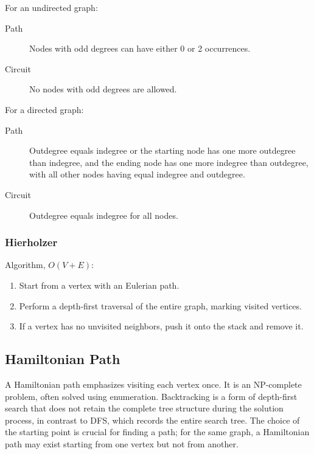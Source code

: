 \documentclass[11pt,journal,compsoc]{IEEEtran}
\begin{document}
For an undirected graph:

\begin{description}
    \item[Path] Nodes with odd degrees can have either 0 or 2 occurrences.
    
    \item[Circuit] No nodes with odd degrees are allowed.
\end{description}

For a directed graph:

\begin{description}
    \item[Path] Outdegree equals indegree or the starting node has one more outdegree than indegree, and the ending node has one more indegree than outdegree, with all other nodes having equal indegree and outdegree.
    
    \item[Circuit] Outdegree equals indegree for all nodes.
\end{description}

\subsubsection{Hierholzer}

Algorithm, $O(V + E)$:

\begin{enumerate}
    \item Start from a vertex with an Eulerian path.
    
    \item Perform a depth-first traversal of the entire graph, marking visited vertices.
    
    \item If a vertex has no unvisited neighbors, push it onto the stack and remove it.
\end{enumerate}

\subsection{Hamiltonian Path}

A Hamiltonian path emphasizes visiting each vertex once. It is an NP-complete problem, often solved using enumeration. Backtracking is a form of depth-first search that does not retain the complete tree structure during the solution process, in contrast to DFS, which records the entire search tree. The choice of the starting point is crucial for finding a path; for the same graph, a Hamiltonian path may exist starting from one vertex but not from another.
\end{document}
